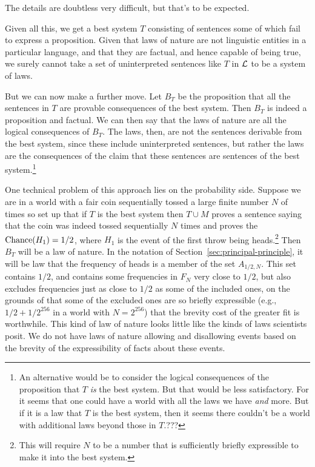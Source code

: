 The details are doubtless very difficult, but that's to be expected.

Given all this, we get a best system $T$ consisting of sentences some of which fail to express a proposition. Given that laws of nature
are not linguistic entities in a particular language, and that they are factual, and hence capable of being true, 
we surely cannot take  a set of uninterpreted sentences like $T$ in $\mathcal L$ to be a system of laws. 

But we can now make a further move.
Let $B_T$ be the proposition that all the sentences in $T$ are provable consequences of the best system. Then $B_T$ is indeed a proposition
and factual. We can then say that the laws of nature are all the logical consequences of $B_T$. The laws, then, are not the sentences derivable from the best system, 
since these include uninterpreted sentences, but rather the laws are the consequences of the claim that these sentences are sentences of the 
best system.\footnote{An alternative would be
to consider the logical consequences of the proposition that $T$ \textit{is} the best system. But that would be less satisfactory. For it
seems that one could have a world with all the laws we have \textit{and} more. But if it is a law that $T$ is the best system, then it seems
there couldn't be a world with additional laws beyond those in $T$.???}

One technical problem of this approach lies on the probability side. Suppose we are in a world with a fair coin sequentially tossed a large finite 
number $N$ of times so set up that if $T$ is the best system then $T\cup M$ proves a sentence saying that the coin was indeed tossed 
sequentially $N$ times and proves the $\operatorname{Chance}(H_1)=1/2$, where $H_1$ is the event of the first throw being heads.\footnote{This 
will require $N$ to be a number that is sufficiently briefly expressible to make it into the best system.} Then $B_T$ will be a law of nature.
In the notation of Section~\ref{sec:principal-principle}, it will be law that the frequency of heads is a member of the set $A_{1/2,N}$.
This set contains $1/2$, and contains some frequencies in $F_N$ very close to $1/2$, but also excludes frequencies just as close to
$1/2$ as some of the included ones, on the grounds of that some of the excluded ones are so briefly expressible (e.g., $1/2+1/2^{256}$
in a world with $N=2^{256}$) that the brevity cost of the greater fit is worthwhile. This kind of law of nature looks little like the 
kinds of laws scientists posit. We do not have laws of nature allowing and disallowing events based on the brevity of the expressibility 
of facts about these events.


